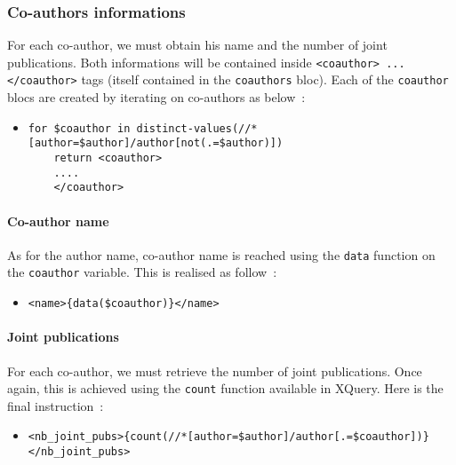 \documentclass{article}
\begin{document}
    \subsubsection{Co-authors informations}
      For each co-author, we must obtain his name and the number of joint publications. Both informations will be contained inside \verb|<coauthor> ... </coauthor>| tags (itself contained in the \verb|coauthors| bloc). Each of the \verb|coauthor| blocs are created by iterating on co-authors as below~:
      \begin{itemize}
	\item \begin{verbatim}
for $coauthor in distinct-values(//*[author=$author]/author[not(.=$author)])
    return <coauthor>
    ....
    </coauthor>\end{verbatim}
      \end{itemize}
      
      \paragraph{Co-author name}
	As for the author name, co-author name is reached using the \verb|data| function on the \verb|coauthor| variable. This is realised as follow~:
	\begin{itemize}
	  \item \verb|<name>{data($coauthor)}</name>|
	\end{itemize}
	
      \paragraph{Joint publications}
	For each co-author, we must retrieve the number of joint publications. Once again, this is achieved using the \verb|count| function available in XQuery. Here is the final instruction~:
	\begin{itemize}
	  \item \verb|<nb_joint_pubs>{count(//*[author=$author]/author[.=$coauthor])}</nb_joint_pubs>|
	\end{itemize}
\end{document}
